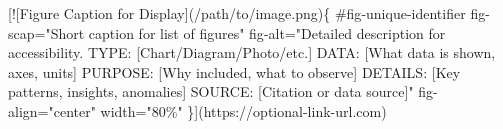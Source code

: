 \documentclass[
  11pt,
  letterpaper,
]{book}
\newenvironment{Shaded}{\begin{snugshade}}{\end{snugshade}}
\newcommand{\CommentTok}[1]{\textcolor[rgb]{0.37,0.37,0.37}{#1}}
\newcommand{\NormalTok}[1]{\textcolor[rgb]{0.00,0.23,0.31}{#1}}
\newcommand{\OtherTok}[1]{\textcolor[rgb]{0.00,0.23,0.31}{#1}}
\begin{document}
\begin{Shaded}
\begin{Highlighting}[]

  \CommentTok{[}\OtherTok{![Figure Caption for Display}\CommentTok{](/path/to/image.png)}\NormalTok{\{}
\NormalTok{    \#fig{-}unique{-}identifier}
\NormalTok{    fig{-}scap="Short caption for list of figures"}
\NormalTok{    fig{-}alt="Detailed description for accessibility.}
\NormalTok{            TYPE: }\CommentTok{[}\OtherTok{Chart/Diagram/Photo/etc.}\CommentTok{]}
\NormalTok{            DATA: }\CommentTok{[}\OtherTok{What data is shown, axes, units}\CommentTok{]}
\NormalTok{            PURPOSE: }\CommentTok{[}\OtherTok{Why included, what to observe}\CommentTok{]}
\NormalTok{            DETAILS: }\CommentTok{[}\OtherTok{Key patterns, insights, anomalies}\CommentTok{]}
\NormalTok{            SOURCE: }\CommentTok{[}\OtherTok{Citation or data source}\CommentTok{]}\NormalTok{"}
\NormalTok{    fig{-}align="center"}
\NormalTok{    width="80\%"}
\NormalTok{  \}](https://optional{-}link{-}url.com)}

\end{Highlighting}
\end{Shaded}
\end{document}
